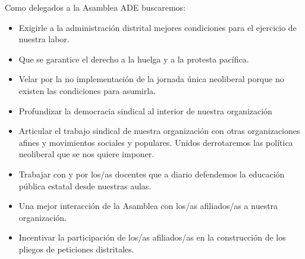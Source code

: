 \documentclass[10pt, notumble, letterpaper]{leaflet}
\begin{document}
Como delegados a la Asamblea ADE buscaremos:
\begin{itemize}
\item Exigirle a la administración distrital mejores condiciones para el ejercicio de nuestra labor.
\item Que se garantice el derecho a la huelga y a la protesta pacífica.
\item Velar por la no implementación de la jornada única neoliberal porque no existen las condiciones para asumirla.
\item Profundizar la democracia sindical al interior de nuestra organización
\item Articular el trabajo sindical de nuestra organización con otras organizaciones afines y movimientos sociales y populares. Unidos derrotaremos las política neoliberal que se nos quiere imponer.
\item Trabajar con y por los/as docentes que a diario defendemos la educación pública estatal desde nuestras aulas.
\item Una mejor interacción de la Asamblea con los/as afiliados/as a nuestra organización.
\item Incentivar la participación de los/as afiliados/as en la construcción de los pliegos de peticiones distritales.
\end{itemize}
\vspace{.25cm}
\newpage
{}
\end{document}
